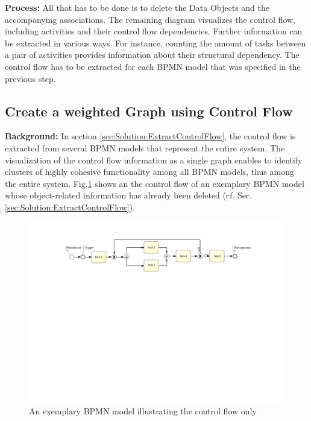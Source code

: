 \noindent
\textbf{Process:} All that has to be done is to delete the Data Objects and the accompanying associations. The remaining diagram visualizes the control flow, including activities and their control flow dependencies. Further information can be extracted in various ways. For instance, counting the amount of tasks between a pair of activities provides information about their structural dependency. The control flow has to be extracted for each BPMN model that was specified in the previous step.

\subsection{Create a weighted Graph using Control Flow}
\label{sec:Solution:CreateGraphControl}
\textbf{Background:} In section \ref{sec:Solution:ExtractControlFlow}, the control flow is extracted from several BPMN models that represent the entire system.
The visualization of the control flow information as a single graph enables to identify clusters of highly cohesive functionality among all BPMN models, thus among the entire system. Fig.\ref{fig:controlFlow} shows an the control flow of an exemplary BPMN model whose object-related information has already been deleted (cf. Sec.\ref{sec:Solution:ExtractControlFlow}).

 \begin{figure}[h!]
	\includegraphics[width=\textwidth, trim={4.5cm 14cm 4.0cm 1.5cm}]{img/ControlFlowExample.pdf}
	\caption{An exemplary BPMN model illustrating the control flow only  }
	\label{fig:controlFlow}
\end{figure}

